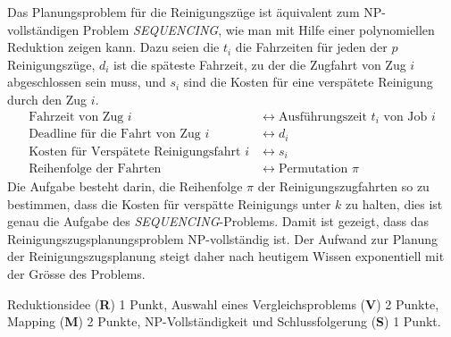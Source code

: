 \begin{loesung}
Das Planungsproblem für die Reinigungszüge ist äquivalent zum
NP-vollständigen Problem \textsl{SEQUENCING}, wie man mit Hilfe
einer polynomiellen Reduktion zeigen kann.
Dazu seien die $t_i$ die Fahrzeiten für jeden der $p$ Reinigungszüge,
$d_i$ ist die späteste Fahrzeit, zu der die Zugfahrt von Zug
$i$ abgeschlossen sein muss, und $s_i$ sind die Kosten für eine verspätete
Reinigung durch den Zug $i$.
\begin{align*}
\text{Fahrzeit von Zug $i$}
&
\leftrightarrow\text{Ausführungszeit $t_i$ von Job $i$}
\\
\text{Deadline für die Fahrt von Zug $i$}
&
\leftrightarrow d_i
\\
\text{Kosten für Verspätete Reinigungsfahrt $i$}
&
\leftrightarrow s_i
\\
\text{Reihenfolge der Fahrten}&
\leftrightarrow \text{Permutation $\pi$}
\end{align*}
Die Aufgabe besteht darin, die Reihenfolge $\pi$ der Reinigungszugfahrten so
zu bestimmen, dass die Kosten für verspätte Reinigungs unter $k$ zu halten,
dies ist genau die Aufgabe des \textsl{SEQUENCING}-Problems.
Damit ist gezeigt, dass das Reinigungszugsplanungsproblem NP-vollständig ist.
Der Aufwand zur Planung der Reinigungszugsplanung steigt daher nach heutigem
Wissen exponentiell mit der Grösse des Problems.
\end{loesung}

\begin{bewertung}
Reduktionsidee ({\bf R}) 1 Punkt,
Auswahl eines Vergleichsproblems ({\bf V}) 2 Punkte,
Mapping ({\bf M}) 2 Punkte,
NP-Vollständigkeit und Schlussfolgerung ({\bf S}) 1 Punkt.
\end{bewertung}
